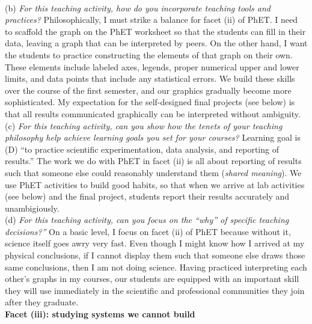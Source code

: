 \documentclass[../../../main.tex]{subfiles}
\begin{document}
\\
\vspace{0.25cm}
(b) \textit{For this teaching activity, how do you incorporate teaching tools and practices?} Philosophically, I must strike a balance for facet (ii) of PhET.  I need to scaffold the graph on the PhET worksheet so that the students can fill in their data, leaving a graph that can be interpreted by peers.  On the other hand, I want the students to practice constructing the elements of that graph on their own.  These elements include labeled axes, legends, proper numerical upper and lower limits, and data points that include any statistical errors.  We build these skills over the course of the first semester, and our graphics gradually become more sophisticated.  My expectation for the self-designed final projects (see below) is that all results communicated graphically can be interpreted without ambiguity. 
\\
\vspace{0.25cm}
(c) \textit{For this teaching activity, can you show how the tenets of your teaching philosophy help achieve learning goals you
set for your courses?} Learning goal is (D) ``to practice scientific experimentation, data analysis, and reporting of results.''  The work we do with PhET in facet (ii) is all about reporting of results such that someone else could reasonably understand them (\textit{shared meaning}).  We use PhET activities to build good habits, so that when we arrive at lab activities (see below) and the final project, students report their results accurately and unambigiously.
\\
\vspace{0.25cm}
(d) \textit{For this teaching activity, can you focus on the ``why'' of specific teaching decisions?''}  On a basic level, I focus on facet (ii) of PhET because without it, science itself goes awry very fast.  Even though I might know how I arrived at my physical conclusions, if I cannot display them such that someone else draws those same conclusions, then I am not doing science.  Having practiced interpreting each other's graphs in my courses, our students are equipped with an important skill they will use immediately in the scientific and professional communities they join after they graduate.
\\
\vspace{0.25cm}
\textbf{Facet (iii): studying systems we cannot build}
\\
\vspace{0.25cm}
\end{document}
